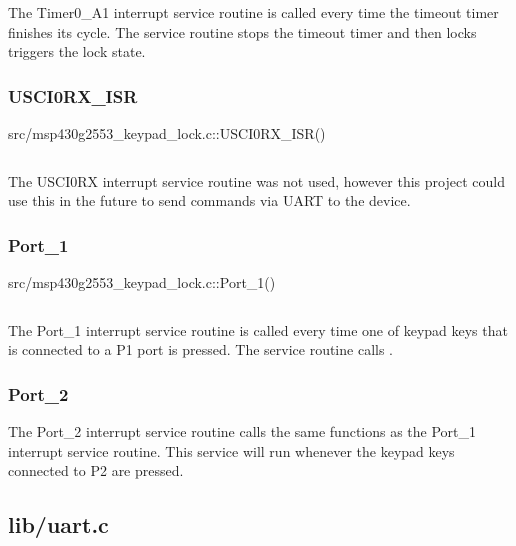 \documentclass{article}
\begin{document}
The Timer0\_A1 interrupt service routine is called every time the timeout timer
finishes its cycle. The service routine stops the timeout timer and then locks
triggers the lock state.

\subsubsection{USCI0RX\_ISR}

\begin{listing}[H]
  \caption{src/msp430g2553\_keypad\_lock.c::USCI0RX\_ISR()}
  \inputminted[linenos,firstline=43, lastline=54]{C}{../msp430g2553/src/msp430g2553_keypad_lock.c}
\end{listing}

The USCI0RX interrupt service routine was not used, however this project could
use this in the future to send commands via UART to the device.

\subsubsection{Port\_1}

\begin{listing}[H]
  \caption{src/msp430g2553\_keypad\_lock.c::Port\_1()}
  \inputminted[linenos,firstline=55, lastline=69]{C}{../msp430g2553/src/msp430g2553_keypad_lock.c}
\end{listing}

The Port\_1 interrupt service routine is called every time one of keypad keys
that is connected to a P1 port is pressed. The service routine calls
.

\subsubsection{Port\_2}


The Port\_2 interrupt service routine calls the same functions as the Port\_1
interrupt service routine. This service will run whenever the keypad keys
connected to P2 are pressed.

\subsection{lib/uart.c}
\end{document}
